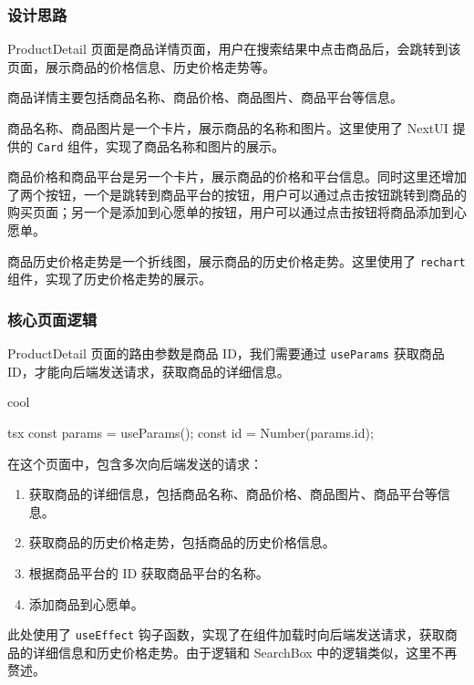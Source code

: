 \subsubsection{设计思路}

ProductDetail 页面是商品详情页面，用户在搜索结果中点击商品后，会跳转到该页面，展示商品的价格信息、历史价格走势等。

商品详情主要包括商品名称、商品价格、商品图片、商品平台等信息。

商品名称、商品图片是一个卡片，展示商品的名称和图片。这里使用了 NextUI 提供的 \texttt{Card} 组件，实现了商品名称和图片的展示。

商品价格和商品平台是另一个卡片，展示商品的价格和平台信息。同时这里还增加了两个按钮，一个是跳转到商品平台的按钮，用户可以通过点击按钮跳转到商品的购买页面；另一个是添加到心愿单的按钮，用户可以通过点击按钮将商品添加到心愿单。

商品历史价格走势是一个折线图，展示商品的历史价格走势。这里使用了 \texttt{rechart} 组件，实现了历史价格走势的展示。

\subsubsection{核心页面逻辑}

ProductDetail 页面的路由参数是商品 ID，我们需要通过 \texttt{useParams} 获取商品 ID，才能向后端发送请求，获取商品的详细信息。

\begin{codebox}{}{cool}
\begin{amzcode}{tsx}
const params = useParams();
const id = Number(params.id);
\end{amzcode}
\end{codebox}

在这个页面中，包含多次向后端发送的请求：

\begin{enumerate}
  \item 获取商品的详细信息，包括商品名称、商品价格、商品图片、商品平台等信息。
  \item 获取商品的历史价格走势，包括商品的历史价格信息。
  \item 根据商品平台的 ID 获取商品平台的名称。
  \item 添加商品到心愿单。
\end{enumerate}

此处使用了 \texttt{useEffect} 钩子函数，实现了在组件加载时向后端发送请求，获取商品的详细信息和历史价格走势。由于逻辑和 SearchBox 中的逻辑类似，这里不再赘述。

